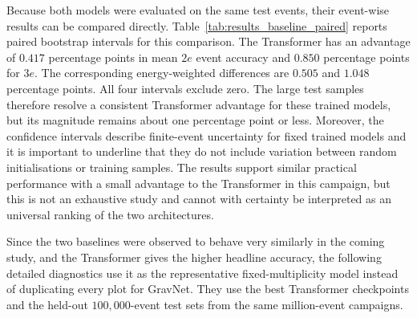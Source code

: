 Because both models were evaluated on the same test events, their
event-wise results can be compared directly. Table~\ref{tab:results_baseline_paired}
reports paired bootstrap intervals for this comparison. The Transformer has
an advantage of \(0.417\) percentage points in mean \(2e\) event accuracy and
\(0.850\) percentage points for \(3e\). The corresponding energy-weighted
differences are \(0.505\) and \(1.048\) percentage points. All four intervals
exclude zero. The large test samples therefore resolve a consistent
Transformer advantage for these trained models, but its magnitude remains
about one percentage point or less. Moreover, the
confidence intervals describe finite-event uncertainty for fixed trained
models and it is important to underline that they do not include variation between random initialisations or
training samples. The results support similar practical performance with a
small advantage to the Transformer in this campaign, but this is not an exhaustive study and cannot with certainty be interpreted as an universal ranking of the two architectures.



Since the two baselines were observed to behave very similarly in the coming study, and the Transformer gives the higher
headline accuracy, the following detailed diagnostics use it as the
representative fixed-multiplicity model instead of duplicating every plot for
GravNet. They use the best Transformer checkpoints and the held-out
\(100{,}000\)-event test sets from the same million-event campaigns.





